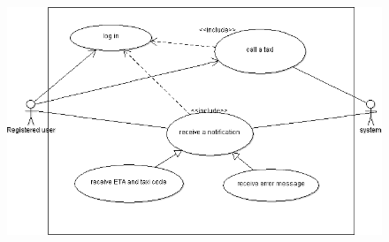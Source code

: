 \begin{itemize}
  \begin{figure} [h]
  \centering
  \includegraphics [scale=0.4]{callataxi.png}
  \end{figure}
	
\newpage
	

\end{itemize}
